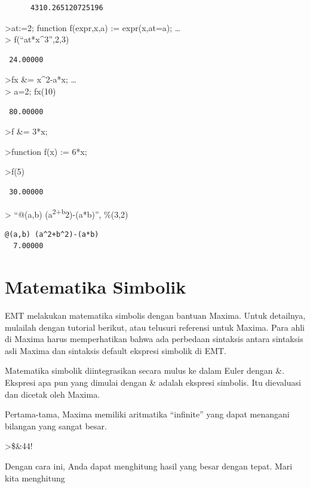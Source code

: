 \documentclass[
]{book}
\begin{document}
\begin{verbatim}
      4310.265120725196 
\end{verbatim}

\textgreater at:=2; function f(expr,x,a) := expr(x,at=a); \ldots{}\\
\textgreater{} f(``at*x\^{}3'',2,3)

\begin{verbatim}
 24.00000 
\end{verbatim}

\textgreater fx \&= x\^{}2-a*x; \ldots{}\\
\textgreater{} a=2; fx(10)

\begin{verbatim}
 80.00000 
\end{verbatim}

\textgreater f \&= 3*x;

\textgreater function f(x) := 6*x;

\textgreater f(5)

\begin{verbatim}
 30.00000 
\end{verbatim}

\textgreater{} ``@(a,b) (a\textsuperscript{2+b}2)-(a*b)'', \%(3,2)

\begin{verbatim}
@(a,b) (a^2+b^2)-(a*b)
  7.00000 
\end{verbatim}

\chapter{Matematika Simbolik}\label{matematika-simbolik}

EMT melakukan matematika simbolis dengan bantuan Maxima. Untuk detailnya, mulailah dengan tutorial berikut, atau telusuri referensi untuk Maxima. Para ahli di Maxima harus memperhatikan bahwa ada perbedaan sintaksis antara sintaksis asli Maxima dan sintaksis default ekspresi simbolik di EMT.

Matematika simbolik diintegrasikan secara mulus ke dalam Euler dengan \&. Ekspresi apa pun yang dimulai dengan \& adalah ekspresi simbolis. Itu dievaluasi dan dicetak oleh Maxima.

Pertama-tama, Maxima memiliki aritmatika ``infinite'' yang dapat menangani bilangan yang sangat besar.

\textgreater\$\&44!

Dengan cara ini, Anda dapat menghitung hasil yang besar dengan tepat. Mari kita menghitung
\end{document}
